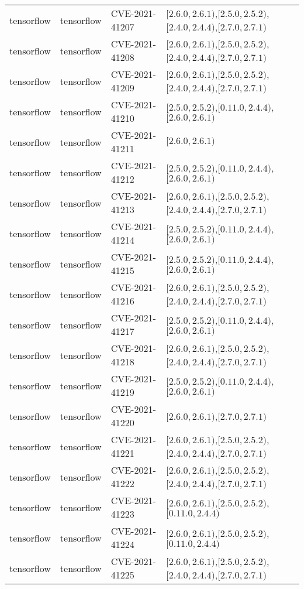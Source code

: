 \begin{tabular}{llll}
tensorflow & tensorflow & CVE-2021-41207 & $[2.6.0,2.6.1)$,$[2.5.0,2.5.2)$,$[2.4.0,2.4.4)$,$[2.7.0,2.7.1)$ \\
tensorflow & tensorflow & CVE-2021-41208 & $[2.6.0,2.6.1)$,$[2.5.0,2.5.2)$,$[2.4.0,2.4.4)$,$[2.7.0,2.7.1)$ \\
tensorflow & tensorflow & CVE-2021-41209 & $[2.6.0,2.6.1)$,$[2.5.0,2.5.2)$,$[2.4.0,2.4.4)$,$[2.7.0,2.7.1)$ \\
tensorflow & tensorflow & CVE-2021-41210 & $[2.5.0,2.5.2)$,$[0.11.0,2.4.4)$,$[2.6.0,2.6.1)$ \\
tensorflow & tensorflow & CVE-2021-41211 & $[2.6.0,2.6.1)$ \\
tensorflow & tensorflow & CVE-2021-41212 & $[2.5.0,2.5.2)$,$[0.11.0,2.4.4)$,$[2.6.0,2.6.1)$ \\
tensorflow & tensorflow & CVE-2021-41213 & $[2.6.0,2.6.1)$,$[2.5.0,2.5.2)$,$[2.4.0,2.4.4)$,$[2.7.0,2.7.1)$ \\
tensorflow & tensorflow & CVE-2021-41214 & $[2.5.0,2.5.2)$,$[0.11.0,2.4.4)$,$[2.6.0,2.6.1)$ \\
tensorflow & tensorflow & CVE-2021-41215 & $[2.5.0,2.5.2)$,$[0.11.0,2.4.4)$,$[2.6.0,2.6.1)$ \\
tensorflow & tensorflow & CVE-2021-41216 & $[2.6.0,2.6.1)$,$[2.5.0,2.5.2)$,$[2.4.0,2.4.4)$,$[2.7.0,2.7.1)$ \\
tensorflow & tensorflow & CVE-2021-41217 & $[2.5.0,2.5.2)$,$[0.11.0,2.4.4)$,$[2.6.0,2.6.1)$ \\
tensorflow & tensorflow & CVE-2021-41218 & $[2.6.0,2.6.1)$,$[2.5.0,2.5.2)$,$[2.4.0,2.4.4)$,$[2.7.0,2.7.1)$ \\
tensorflow & tensorflow & CVE-2021-41219 & $[2.5.0,2.5.2)$,$[0.11.0,2.4.4)$,$[2.6.0,2.6.1)$ \\
tensorflow & tensorflow & CVE-2021-41220 & $[2.6.0,2.6.1)$,$[2.7.0,2.7.1)$ \\
tensorflow & tensorflow & CVE-2021-41221 & $[2.6.0,2.6.1)$,$[2.5.0,2.5.2)$,$[2.4.0,2.4.4)$,$[2.7.0,2.7.1)$ \\
tensorflow & tensorflow & CVE-2021-41222 & $[2.6.0,2.6.1)$,$[2.5.0,2.5.2)$,$[2.4.0,2.4.4)$,$[2.7.0,2.7.1)$ \\
tensorflow & tensorflow & CVE-2021-41223 & $[2.6.0,2.6.1)$,$[2.5.0,2.5.2)$,$[0.11.0,2.4.4)$ \\
tensorflow & tensorflow & CVE-2021-41224 & $[2.6.0,2.6.1)$,$[2.5.0,2.5.2)$,$[0.11.0,2.4.4)$ \\
tensorflow & tensorflow & CVE-2021-41225 & $[2.6.0,2.6.1)$,$[2.5.0,2.5.2)$,$[2.4.0,2.4.4)$,$[2.7.0,2.7.1)$ \\

\end{tabular}
